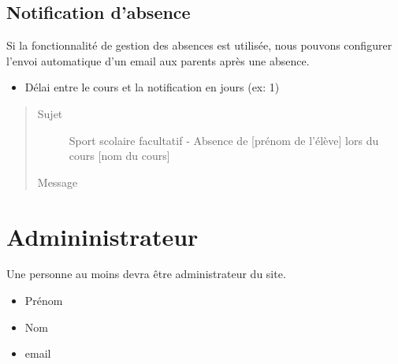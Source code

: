 \documentclass[letterpaper,10pt,english]{sphinxmanual}
\begin{document}
\subsection{Notification d’absence}
\label{\detokenize{configurer:notification-d-absence}}
Si la fonctionnalité de gestion des absences est utilisée, nous pouvons configurer l’envoi automatique d’un email aux
parents après une absence.
\begin{itemize}
\item {} 
Délai entre le cours et la notification en jours (ex: 1)

\end{itemize}
\begin{quote}\begin{description}
\item[{Sujet}] \leavevmode
Sport scolaire facultatif - Absence de {[}prénom de l’élève{]} lors du cours {[}nom du cours{]}

\item[{Message}] \leavevmode
{}

\end{description}\end{quote}


\section{Admininistrateur}
\label{\detokenize{configurer:admininistrateur}}
Une personne au moins devra être administrateur du site.
\begin{itemize}
\item {} 
Prénom

\item {} 
Nom

\item {} 
email

\end{itemize}
\end{document}
